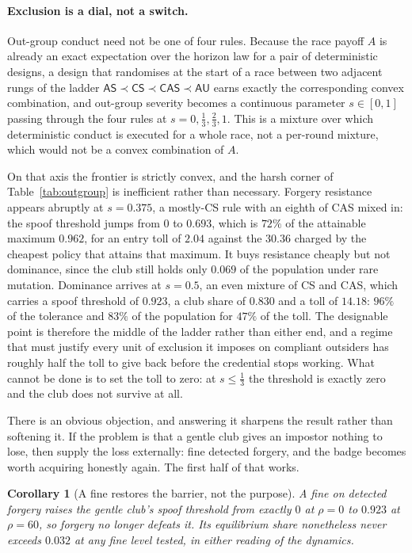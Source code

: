 \documentclass[preprint,12pt]{elsarticle}
\theoremstyle{plain}
\newtheorem{corollary}[theorem]{Corollary}
\theoremstyle{definition}
\newcommand{\AS}{\textsf{AS}}
\newcommand{\CS}{\textsf{CS}}
\newcommand{\CAS}{\textsf{CAS}}
\newcommand{\AU}{\textsf{AU}}
\begin{document}
\paragraph{Exclusion is a dial, not a switch.}
Out-group conduct need not be one of four rules. Because the race payoff $A$ is
already an exact expectation over the horizon law for a pair of deterministic
designs, a design that randomises at the start of a race between two adjacent
rungs of the ladder $\AS \prec \CS \prec \CAS \prec \AU$ earns exactly the
corresponding convex combination, and out-group severity becomes a continuous
parameter $s \in [0,1]$ passing through the four rules at
$s = 0, \tfrac{1}{3}, \tfrac{2}{3}, 1$. This is a mixture over which
deterministic conduct is executed for a whole race, not a per-round mixture,
which would not be a convex combination of $A$.

On that axis the frontier is strictly convex, and the harsh corner of
Table~\ref{tab:outgroup} is inefficient rather than necessary. Forgery
resistance appears abruptly at $s = 0.375$, a mostly-\CS{} rule with an eighth
of \CAS{} mixed in: the spoof threshold jumps from $0$ to $0.693$, which is
$72\%$ of the attainable maximum $0.962$, for an entry toll of $2.04$ against
the $30.36$ charged by the cheapest policy that attains that maximum. It buys
resistance cheaply but not dominance, since the club still holds only $0.069$
of the population under rare mutation. Dominance arrives at $s = 0.5$, an even
mixture of \CS{} and \CAS{}, which carries a spoof threshold of $0.923$, a
club share of $0.830$ and a toll of $14.18$: $96\%$ of the tolerance and
$83\%$ of the population for $47\%$ of the toll. The designable point is
therefore the middle of the ladder rather than either end, and a regime that
must justify every unit of exclusion it imposes on compliant outsiders has
roughly half the toll to give back before the credential stops working. What
cannot be done is to set the toll to zero: at $s \le \tfrac{1}{3}$ the
threshold is exactly zero and the club does not survive at all.

There is an obvious objection, and answering it sharpens the result rather than
softening it. If the problem is that a gentle club gives an impostor nothing to
lose, then supply the loss externally: fine detected forgery, and the badge
becomes worth acquiring honestly again. The first half of that works.

\begin{corollary}[A fine restores the barrier, not the purpose]
\label{cor:rescue}
A fine on detected forgery raises the gentle club's spoof threshold from
exactly $0$ at $\rho = 0$ to $0.923$ at $\rho = 60$, so forgery no longer
defeats it. Its equilibrium share nonetheless never exceeds $0.032$ at any fine
level tested, in either reading of the dynamics.
\end{corollary}
\end{document}
